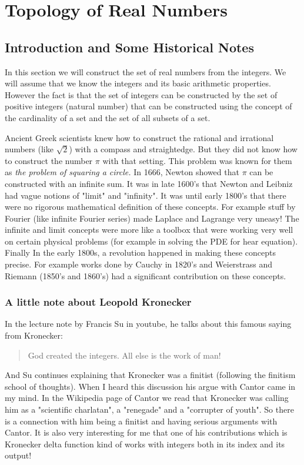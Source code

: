 \chapter{Topology of Real Numbers}
 


\section{Introduction and Some Historical Notes}

In this section we will construct the set of real numbers from the integers. We will assume that we know the integers and its basic arithmetic properties. However the fact is that the set of integers can be constructed by the set of positive integers (natural number) that can be constructed using the concept of the cardinality of a set and the set of all subsets of a set.

Ancient Greek scientists knew how to construct the rational and irrational numbers (like $ \sqrt{2} $) with a compass and straightedge. But they did not know how to construct the number $\pi $ with that setting. This problem was known for them as \emph{the problem of squaring a circle.} In 1666, Newton showed that $ \pi $ can be constructed with an infinite sum. It was in late 1600's that Newton and Leibniz had vague notions of "limit" and "infinity". It was until early 1800's that there were no rigorous mathematical definition of these concepts. For example stuff by Fourier (like infinite Fourier series) made Laplace and Lagrange very uneasy! The infinite and limit concepts were more like a toolbox that were working very well on certain physical problems (for example in solving the PDE for hear equation). Finally In the early 1800s, a revolution happened in making these concepts precise. For example works done by Cauchy in 1820's and Weierstrass and Riemann (1850's and 1860's) had a significant contribution on these concepts.  

\subsection{A little note about Leopold Kronecker}

In the lecture note by Francis Su in youtube, he talks about this famous saying from Kronecker:
\begin{quote}
	God created the integers. All else is the work of man!
\end{quote}

And Su continues explaining that Kronecker was a finitist (following the finitism school of thoughts). When I heard this discussion his argue with Cantor came in my mind. In the Wikipedia page of Cantor we read that Kronecker was calling him as a "scientific charlatan", a "renegade" and a "corrupter of youth". So there is a connection with him being a finitist and having serious arguments with Cantor. It is also very interesting for me that one of his contributions which is Kronecker delta function kind of works with integers both in its index and its output!

